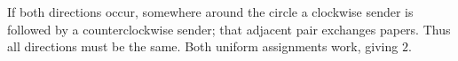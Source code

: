 If both directions occur, somewhere around the circle a clockwise sender is followed by a counterclockwise sender; that adjacent pair exchanges papers. Thus all directions must be the same. Both uniform assignments work, giving $\boxed2$.

